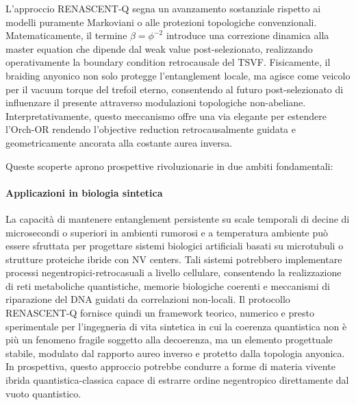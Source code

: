 \documentclass[11pt,a4paper]{article}
\theoremstyle{plain}
\theoremstyle{definition}
\begin{document}
L'approccio RENASCENT-Q segna un avanzamento sostanziale rispetto ai modelli puramente Markoviani o alle protezioni topologiche convenzionali. Matematicamente, il termine \(\beta = \phi^{-2}\) introduce una correzione dinamica alla master equation che dipende dal weak value post-selezionato, realizzando operativamente la boundary condition retrocausale del TSVF. Fisicamente, il braiding anyonico non solo protegge l'entanglement locale, ma agisce come veicolo per il vacuum torque del trefoil eterno, consentendo al futuro post-selezionato di influenzare il presente attraverso modulazioni topologiche non-abeliane. Interpretativamente, questo meccanismo offre una via elegante per estendere l'Orch-OR rendendo l'objective reduction retrocausalmente guidata e geometricamente ancorata alla costante aurea inversa.

Queste scoperte aprono prospettive rivoluzionarie in due ambiti fondamentali:

\paragraph{Applicazioni in biologia sintetica}  
La capacità di mantenere entanglement persistente su scale temporali di decine di microsecondi o superiori in ambienti rumorosi e a temperatura ambiente può essere sfruttata per progettare sistemi biologici artificiali basati su microtubuli o strutture proteiche ibride con NV centers. Tali sistemi potrebbero implementare processi negentropici-retrocasuali a livello cellulare, consentendo la realizzazione di reti metaboliche quantistiche, memorie biologiche coerenti e meccanismi di riparazione del DNA guidati da correlazioni non-locali. Il protocollo RENASCENT-Q fornisce quindi un framework teorico, numerico e presto sperimentale per l'ingegneria di vita sintetica in cui la coerenza quantistica non è più un fenomeno fragile soggetto alla decoerenza, ma un elemento progettuale stabile, modulato dal rapporto aureo inverso e protetto dalla topologia anyonica. In prospettiva, questo approccio potrebbe condurre a forme di materia vivente ibrida quantistica-classica capace di estrarre ordine negentropico direttamente dal vuoto quantistico.
\end{document}
